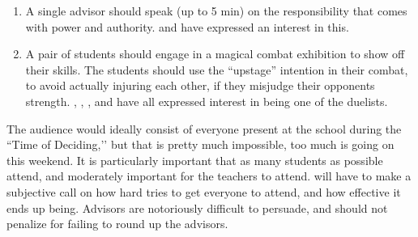 \documentclass[green]{GL2020}
\begin{document}
\begin{enumerate}
\begin{enumerate}
    \item A single advisor should speak (up to 5 min) on the responsibility that comes with power and authority. \cHedonist{\full} and \cCurse{\full} have expressed an interest in this.
    \item A pair of students should engage in a magical combat exhibition to show off their skills. The students should use the “upstage” intention in their combat, to avoid actually injuring each other, if they misjudge their opponents strength. \cTechStar{\full}, \cHeir{\full}, \cLibAssist{\full}, and \cAmbition{\full} have all expressed interest in being one of the duelists.
  \end{enumerate}
\end{enumerate}

The audience would ideally consist of everyone present at the school during the ``Time of Deciding,’’ but that is pretty much impossible, too much is going on this weekend. It is particularly important that as many students as possible attend, and moderately important for the teachers to attend. \cPrincipal{} will have to make a subjective call on how hard \cMusic{} tries to get everyone to attend, and how effective it ends up being. Advisors are notoriously difficult to persuade, and \cPrincipal{} should not penalize \cMusic{} for failing to round up the advisors.
\end{document}
